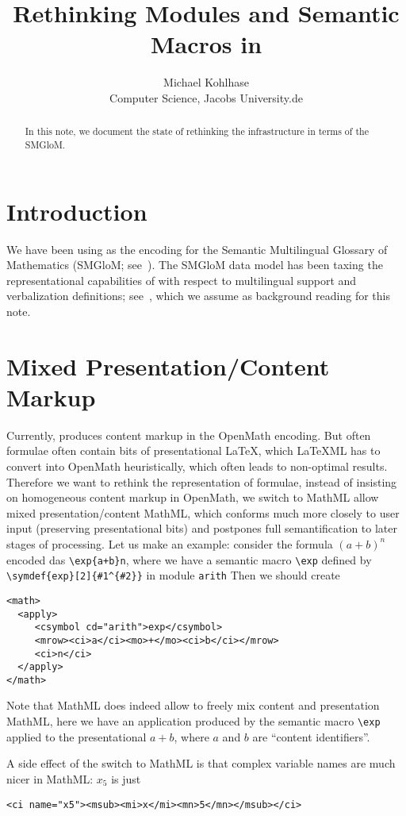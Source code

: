 \documentclass{bluenote}
\title{Rethinking Modules and Semantic Macros in \protect\sTeX}
\author{Michael Kohlhase\\Computer Science, Jacobs University.de}
\def\smglom{\textsf{SMGloM}\xspace}
\def\latexml{{\LaTeX}ML\xspace}
\begin{document}
\maketitle
\begin{abstract}
  In this note, we document the state of rethinking the \sTeX infrastructure in terms of
  the \smglom.
\end{abstract}
\section{Introduction}
We have been using \sTeX as the encoding for the Semantic Multilingual Glossary of
Mathematics (\smglom; see~\cite{IanJucKoh:sps14}). The \smglom data model has been taxing
the representational capabilities of \sTeX with respect to multilingual support and
verbalization definitions; see~\cite{Kohlhase:dmesmgm14}, which we assume as background
reading for this note.

\section{Mixed Presentation/Content Markup}
Currently, \sTeX produces content markup in the OpenMath encoding. But often \sTeX
formulae often contain bits of presentational {\LaTeX}, which \latexml has to convert into
OpenMath heuristically, which often leads to non-optimal results. Therefore we want to
rethink the representation of formulae, instead of insisting on homogeneous content markup
in OpenMath, we switch to MathML allow mixed presentation/content MathML, which conforms
much more closely to user input (preserving presentational bits) and postpones full
semantification to later stages of processing. Let us make an example: consider the
formula $(a+b)^n$ encoded das \lstinline|\exp{a+b}n|, where we have a semantic macro
\lstinline|\exp| defined by \lstinline|\symdef{exp}[2]{#1^{#2}}| in module
\lstinline|arith| Then we should create
\begin{lstlisting}[language=MathML]
<math>
  <apply>
     <csymbol cd="arith">exp</csymbol>
     <mrow><ci>a</ci><mo>+</mo><ci>b</ci></mrow>
     <ci>n</ci>
  </apply>
</math>
\end{lstlisting}
Note that MathML does indeed allow to freely mix content and presentation MathML, here we
have an application produced by the semantic macro \lstinline|\exp| applied to the
presentational $a+b$, where $a$ and $b$ are ``content identifiers''. 

A side effect of the switch to MathML is that complex variable names are much nicer in
MathML: $x_5$ is just 
\begin{lstlisting}[language=MathML]
<ci name="x5"><msub><mi>x</mi><mn>5</mn></msub></ci>
\end{lstlisting}
\end{document}
